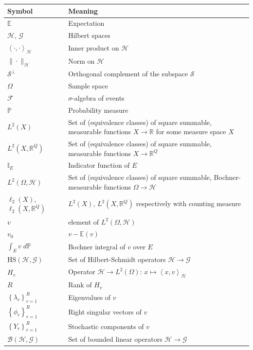 \documentclass{article}
\numberwithin{theorem}{section}
\numberwithin{lemma}{section}
\numberwithin{definition}{section}
\numberwithin{assumption}{section}
\numberwithin{proposition}{section}
\numberwithin{remark}{section}
\numberwithin{corollary}{section}
\numberwithin{conjecture}{section}
\numberwithin{example}{section}
\newcommand{\R}{\mathbb{R}}
\newcommand{\E}{\mathbb{E}}
\newcommand{\bset}[1]{\left \lbrace #1 \right \rbrace}
\newcommand{\aset}[1]{\left \langle #1 \right \rangle}
\newcommand{\CH}{\mathcal H}
\begin{document}
\begin{multicols*}{2}
\begin{center}
\begin{tabular}{|C{4 em}|p{15 em}|}
	\hline
	Symbol & Meaning \\
	\hline
	$\E$ & Expectation \\
	$\mathcal H$, $\mathcal G$ & Hilbert spaces \\
	$\aset{\cdot, \cdot}_\mathcal H$ & Inner product on $\mathcal H$ \\
	$\|\cdot \|_\mathcal H$ & Norm on $\mathcal H$ \\
	$\mathcal S^\perp$ & Orthogonal complement of the subspace $\mathcal S$ \\
	$\Omega$ & Sample space \\
	$\mathcal F$ & $\sigma$-algebra of events \\
	$\mathbb P$ & Probability measure \\
	$L^2(X)$ & Set of (equivalence classes) of square summable, measurable  functions $X \to \R$ for some measure space $X$ \\
	$L^2(X, \R^Q)$ & Set of (equivalence classes) of square summable, measurable functions $X \to \R^Q$ \\
	$\mathbb I_E$ & Indicator function of $E$ \\
	$L^2(\Omega, \mathcal H)$ & Set of (equivalence classes) of square summable, Bochner-measurable functions $\Omega \to \mathcal H$ \\
	$\ell_2(X)$, $\ell_2(X, \R^Q)$ & $L^2(X)$, $L^2(X, \R^Q)$ respectively with counting measure \\
	$v$ & element of $L^2(\Omega, \mathcal H)$ \\
	$v_0$ & $v - \E(v)$ \\
	$\int_E v \; d \mathbb P$ & Bochner integral of $v$ over $E$ \\
	$\text{HS}(\mathcal H, \mathcal G)$ & Set of Hilbert-Schmidt operators $\mathcal H \to \mathcal G$ \\
	$H_v$ & Operator $\CH \to L^2(\Omega)$: $x \mapsto \aset{x,v}_\mathcal H$ \\
	$R$ & Rank of $H_v$ \\
	$\bset{\lambda_r}_{r=1}^R$ & Eigenvalues of $v$ \\
	$\bset{\phi_r}_{r=1}^R$ & Right singular vectors of $v$ \\
	$\bset{Y_r}_{r=1}^R$ & Stochastic components of $v$ \\
	$\mathcal B(\mathcal H, \mathcal G)$ & Set of bounded linear operators $\mathcal H \to \mathcal G$ \\

\end{tabular}
\end{center}
\end{multicols*}
\end{document}

